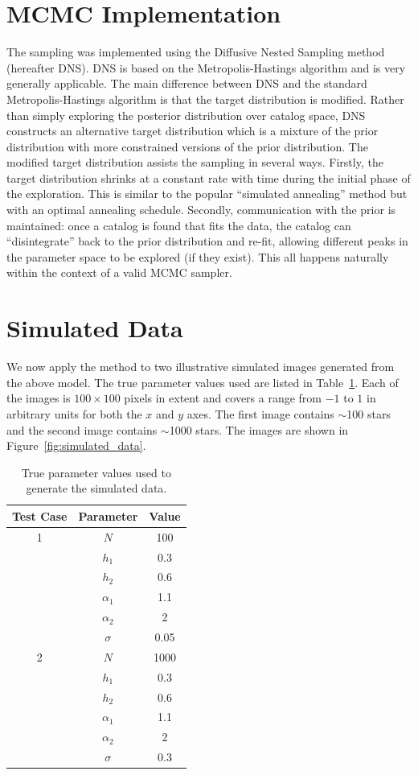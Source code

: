 \documentclass[letterpaper, 11pt]{article}
\begin{document}
\section{MCMC Implementation}
The sampling was implemented using the Diffusive Nested Sampling \citep{dnest}
method (hereafter DNS). DNS is based on the Metropolis-Hastings algorithm and
is very generally applicable. The main difference between DNS and the standard
Metropolis-Hastings algorithm is that the target distribution is modified.
Rather than simply exploring the posterior distribution over catalog space,
DNS constructs an alternative target distribution which is a mixture of the
prior distribution with more constrained versions of the prior distribution.
The modified target distribution assists the sampling in several ways.
Firstly, the target distribution shrinks at a constant rate with time during the
initial phase of the exploration. This is similar to the popular ``simulated
annealing'' method but with an optimal annealing schedule. Secondly,
communication with the prior is maintained: once a catalog is found that
fits the data, the catalog can ``disintegrate'' back to the prior distribution
and re-fit, allowing different peaks in the parameter space to be explored
(if they exist). This all happens naturally within the context of a valid
MCMC sampler.

\section{Simulated Data}\label{sec:simulated_data}
We now apply the method to two illustrative simulated images generated from
the above model. The true parameter values used are listed in
Table~\ref{tab:truth}.
Each of the images
is $100 \times 100$ pixels in extent and covers a range from $-1$ to $1$ in
arbitrary units for both the $x$ and $y$ axes. The first image contains
$\sim$100 stars and the second image contains $\sim$1000 stars. The images
are shown in Figure~\ref{fig:simulated_data}.

\begin{table}
\begin{center}
\begin{tabular}{|c|c|c|}
\hline
Test Case & Parameter & Value \\
\hline
1 & $N$ & 100\\
  & $h_1$ & 0.3\\
  & $h_2$ & 0.6\\
  & $\alpha_1$ & 1.1\\
  & $\alpha_2$ & 2\\
  & $\sigma$ & 0.05\\
\hline
2 & $N$ & 1000\\
  & $h_1$ & 0.3\\
  & $h_2$ & 0.6\\
  & $\alpha_1$ & 1.1\\
  & $\alpha_2$ & 2\\
  & $\sigma$ & 0.3\\
\hline
\end{tabular}
\end{center}
\caption{True parameter values used to generate the simulated data.
\label{tab:truth}}
\end{table}
\end{document}

